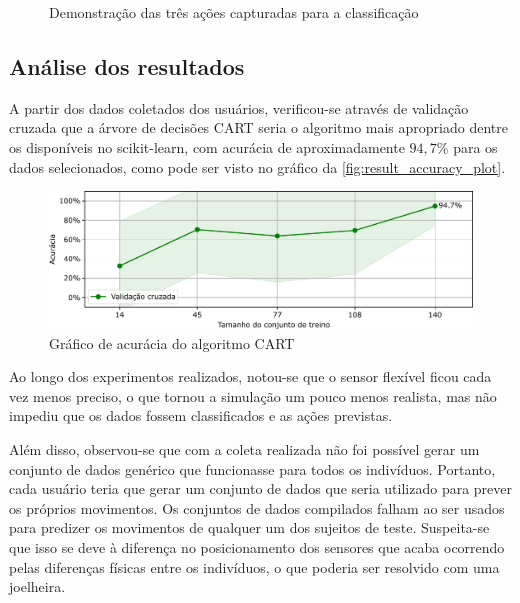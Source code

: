 \begin{figure}[ht]
	\caption{\label{fig:result_estados}Demonstração das três ações capturadas para a classificação}
	\begin{center}
	\end{center}
\end{figure}

\subsection{Análise dos resultados}\label{sec:result_analise}

A partir dos dados coletados dos usuários, verificou-se através de validação cruzada que a árvore de decisões CART seria o algoritmo mais apropriado dentre os disponíveis no scikit-learn, com acurácia de aproximadamente \(94{,}7\%\) para os dados selecionados, como pode ser visto no gráfico da \autoref{fig:result_accuracy_plot}.

\begin{figure}[ht]
	\caption{\label{fig:result_accuracy_plot}Gráfico de acurácia do algoritmo CART}
	\begin{center}
	    \includegraphics[width=\textwidth]{resources/result_accuracy_plot}
	\end{center}
\end{figure}

Ao longo dos experimentos realizados, notou-se que o sensor flexível ficou cada vez menos preciso, o que tornou a simulação um pouco menos realista, mas não impediu que os dados fossem classificados e as ações previstas.

Além disso, observou-se que com a coleta realizada não foi possível gerar um conjunto de dados genérico que funcionasse para todos os indivíduos. Portanto, cada usuário teria que gerar um conjunto de dados que seria utilizado para prever os próprios movimentos. Os conjuntos de dados compilados falham ao ser usados para predizer os movimentos de qualquer um dos sujeitos de teste. Suspeita-se que isso se deve à diferença no posicionamento dos sensores que acaba ocorrendo pelas diferenças físicas entre os indivíduos, o que poderia ser resolvido com uma joelheira.